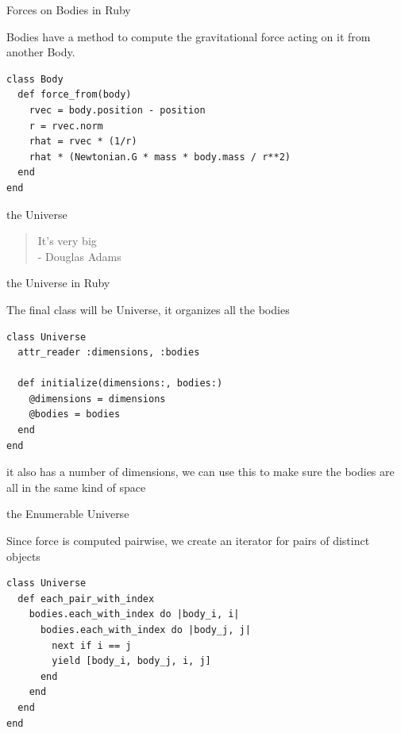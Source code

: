 \documentclass[bigger]{beamer}
\begin{document}
\begin{frame}[fragile,label=sec-26]{Forces on Bodies in Ruby}
 \begin{block}{Bodies have a method to compute the gravitational force acting on it from another Body.}
\begin{verbatim}
class Body
  def force_from(body)
    rvec = body.position - position
    r = rvec.norm
    rhat = rvec * (1/r)
    rhat * (Newtonian.G * mass * body.mass / r**2)
  end
end
\end{verbatim}
\end{block}
\end{frame}
\begin{frame}[label=sec-27]{the Universe}
\begin{quote}
It's very big \\
- Douglas Adams
\end{quote}
\end{frame}

\begin{frame}[fragile,label=sec-28]{the Universe in Ruby}
 \begin{block}{The final class will be Universe, it organizes all the bodies}
\begin{verbatim}
class Universe
  attr_reader :dimensions, :bodies

  def initialize(dimensions:, bodies:)
    @dimensions = dimensions
    @bodies = bodies
  end
end
\end{verbatim}
\end{block}

\begin{block}{it also has a number of \alert{\alert{dimensions}}, we can use this to make sure the bodies are all in the same kind of space}
\end{block}
\end{frame}

\begin{frame}[fragile,label=sec-29]{the Enumerable Universe}
 \begin{block}{Since force is computed pairwise, we create an iterator for pairs of distinct objects}
\begin{verbatim}
class Universe
  def each_pair_with_index
    bodies.each_with_index do |body_i, i|
      bodies.each_with_index do |body_j, j|
        next if i == j
        yield [body_i, body_j, i, j]
      end
    end
  end
end
\end{verbatim}
\end{block}
\end{frame}
\end{document}
